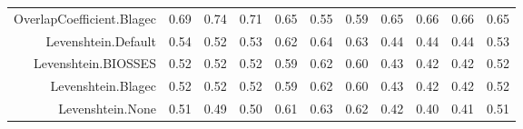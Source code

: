 \begin{table}[!h]
\begin{tabular}{rrrrrrrrrrr}
  OverlapCoefficient.Blagec & 0.69 & 0.74 & 0.71 & 0.65 & 0.55 & 0.59 & 0.65 & 0.66 & 0.66 & 0.65 \\ 
  Levenshtein.Default & 0.54 & 0.52 & 0.53 & 0.62 & 0.64 & 0.63 & 0.44 & 0.44 & 0.44 & 0.53 \\ 
  Levenshtein.BIOSSES & 0.52 & 0.52 & 0.52 & 0.59 & 0.62 & 0.60 & 0.43 & 0.42 & 0.42 & 0.52 \\ 
  Levenshtein.Blagec & 0.52 & 0.52 & 0.52 & 0.59 & 0.62 & 0.60 & 0.43 & 0.42 & 0.42 & 0.52 \\ 
  Levenshtein.None & 0.51 & 0.49 & 0.50 & 0.61 & 0.63 & 0.62 & 0.42 & 0.40 & 0.41 & 0.51 \\ 
   \hline
\end{tabular}
\endgroup
\end{table}
